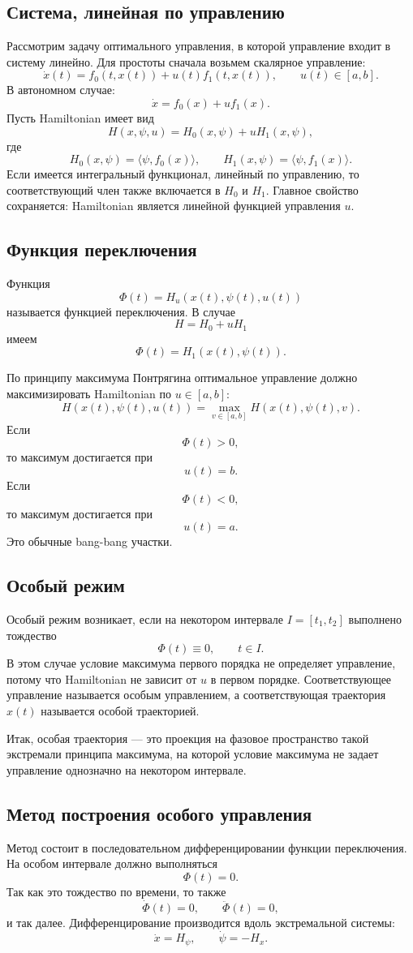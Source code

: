 \documentclass[12pt,a4paper]{article}
\begin{document}
\subsection*{Система, линейная по управлению}
Рассмотрим задачу оптимального управления, в которой управление входит в систему линейно. Для простоты сначала возьмем скалярное управление:
\[
\dot x(t)=f_0(t,x(t))+u(t)f_1(t,x(t)),
\qquad u(t)\in [a,b].
\]
В автономном случае:
\[
\dot x=f_0(x)+u f_1(x).
\]
Пусть Hamiltonian имеет вид
\[
H(x,\psi,u)=H_0(x,\psi)+uH_1(x,\psi),
\]
где
\[
H_0(x,\psi)=\langle \psi,f_0(x)\rangle,
\qquad
H_1(x,\psi)=\langle \psi,f_1(x)\rangle.
\]
Если имеется интегральный функционал, линейный по управлению, то соответствующий член также включается в $H_0$ и $H_1$. Главное свойство сохраняется: Hamiltonian является линейной функцией управления $u$.

\subsection*{Функция переключения}
Функция
\[
\Phi(t)=H_u(x(t),\psi(t),u(t))
\]
называется функцией переключения. В случае
\[
H=H_0+uH_1
\]
имеем
\[
\Phi(t)=H_1(x(t),\psi(t)).
\]

По принципу максимума Понтрягина оптимальное управление должно максимизировать Hamiltonian по $u\in[a,b]$:
\[
H(x(t),\psi(t),u(t))=
\max_{v\in[a,b]}H(x(t),\psi(t),v).
\]
Если
\[
\Phi(t)>0,
\]
то максимум достигается при
\[
u(t)=b.
\]
Если
\[
\Phi(t)<0,
\]
то максимум достигается при
\[
u(t)=a.
\]
Это обычные bang-bang участки.

\subsection*{Особый режим}
Особый режим возникает, если на некотором интервале $I=[t_1,t_2]$ выполнено тождество
\[
\Phi(t)\equiv0,
\qquad t\in I.
\]
В этом случае условие максимума первого порядка не определяет управление, потому что Hamiltonian не зависит от $u$ в первом порядке. Соответствующее управление называется особым управлением, а соответствующая траектория $x(t)$ называется особой траекторией.

Итак, особая траектория --- это проекция на фазовое пространство такой экстремали принципа максимума, на которой условие максимума не задает управление однозначно на некотором интервале.

\subsection*{Метод построения особого управления}
Метод состоит в последовательном дифференцировании функции переключения. На особом интервале должно выполняться
\[
\Phi(t)=0.
\]
Так как это тождество по времени, то также
\[
\dot\Phi(t)=0,\qquad \ddot\Phi(t)=0,
\]
и так далее. Дифференцирование производится вдоль экстремальной системы:
\[
\dot x=H_\psi,
\qquad
\dot\psi=-H_x.
\]
\end{document}
